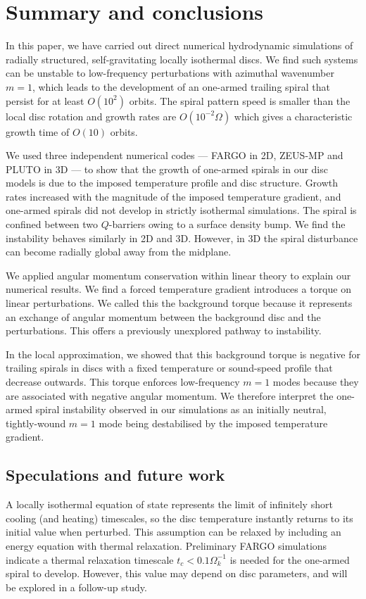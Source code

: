 \section{Summary and conclusions}\label{summary}
In this paper, we have carried out direct numerical hydrodynamic
simulations of radially structured, self-gravitating locally
isothermal discs.     
We find such systems can be unstable to low-frequency perturbations
with azimuthal wavenumber $m=1$, which leads to the development of an one-armed 
trailing spiral that persist for at least $O(10^2)$ orbits. The spiral
pattern speed is smaller than the local disc rotation and
growth rates are $O(10^{-2}\Omega)$ which gives a characteristic
growth time of $O(10)$ orbits.   

We used three independent numerical codes --- FARGO in 2D, ZEUS-MP and
PLUTO in 3D --- to show that the growth of  
one-armed spirals in our disc models is due to the imposed temperature 
profile and disc structure. Growth rates increased 
with the magnitude of the imposed temperature gradient, and one-armed
spirals did not develop in strictly isothermal simulations. The spiral
is confined between two $Q$-barriers owing to a surface density bump. 
We find the instability behaves similarly in 2D and 3D. However, in 3D
the spiral disturbance can become radially global away from 
the midplane.  

We applied angular momentum conservation within linear theory to
explain our numerical results. We find a   
forced temperature gradient introduces a torque on linear 
perturbations. We called this the background torque because it
represents an exchange of angular momentum between the background disc
and the perturbations. This offers a previously unexplored pathway to
instability. 

In the local approximation, we showed that this background torque is
negative for trailing spirals in discs with a fixed temperature or
sound-speed profile that decrease outwards. This torque enforces  
low-frequency $m=1$ modes because they are associated with negative
angular momentum. We therefore interpret the one-armed spiral instability
observed in our simulations as an initially neutral, tightly-wound
$m=1$ mode being destabilised by the imposed temperature gradient. 
   
\subsection{Speculations and future work}
A locally isothermal equation of state represents the limit of
infinitely short cooling (and heating) timescales, so the disc
temperature instantly returns to its initial value when perturbed.  
This assumption can be relaxed by including an energy equation with
thermal relaxation. Preliminary FARGO simulations
indicate a thermal relaxation timescale $t_c < 0.1\Omega_k^{-1}$ is
needed for the one-armed spiral to develop. However, this value may
depend on disc parameters, and will be explored in a follow-up  
study.  

